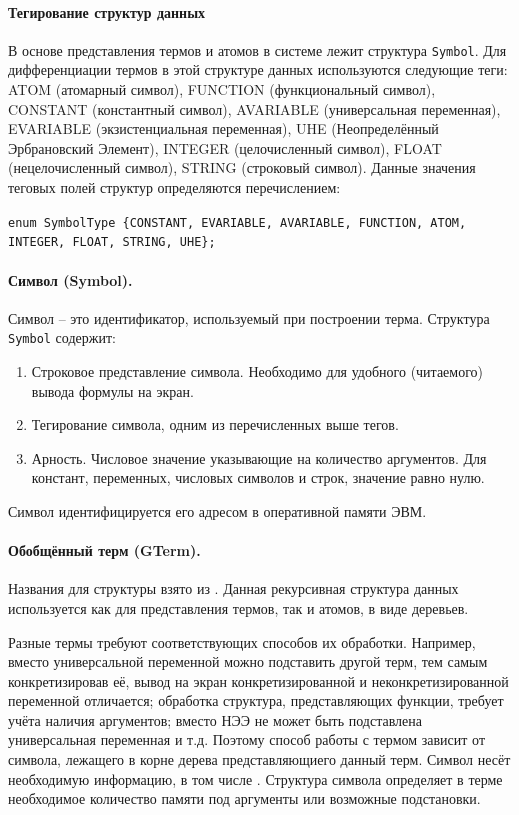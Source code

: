 
\paragraph{Тегирование структур данных}
В основе представления термов и атомов в системе лежит структура \texttt{Symbol}. %
Для дифференциации термов в этой структуре данных используются следующие теги: ATOM (атомарный символ), FUNCTION (функциональный символ), CONSTANT (константный символ), AVARIABLE (универсальная переменная), EVARIABLE (экзистенциальная переменная), UHE (Неопределённый Эрбрановский Элемент), INTEGER (целочисленный символ), FLOAT (нецелочисленный символ), STRING (строковый символ). Данные значения теговых полей структур определяются перечислением:

{\tt enum SymbolType \{CONSTANT, EVARIABLE, AVARIABLE, FUNCTION, ATOM, INTEGER, FLOAT, STRING, UHE\};}

\paragraph{Символ (Symbol).}
Символ -- это идентификатор, используемый при построении терма. Структура \texttt{Symbol} содержит:
\begin{enumerate}
\item Строковое представление символа. Необходимо для удобного (читаемого) вывода формулы на экран.
\item Тегирование символа, одним из перечисленных выше тегов.
\item Арность. Числовое значение указывающие на количество аргументов. Для констант, переменных, числовых символов и строк, значение равно нулю.
\end{enumerate}

Символ идентифицируется его адресом в оперативной памяти ЭВМ.

\paragraph{Обобщённый терм (GTerm).}
Названия для структуры взято из \cite{NNN}. Данная рекурсивная структура данных используется как для представления термов, так и атомов, в виде деревьев.

Разные термы требуют соответствующих способов их обработки. Например, вместо универсальной переменной можно подставить другой терм, тем самым конкретизировав её, вывод на экран конкретизированной и неконкретизированной переменной отличается; обработка  структура, представляющих функции, требует учёта наличия аргументов; вместо НЭЭ не может быть подставлена универсальная переменная и т.д. Поэтому способ работы с термом зависит от символа, лежащего в корне дерева представляющиего данный терм. Символ несёт необходимую информацию, в том числе . Структура символа определяет в терме необходимое количество памяти под аргументы или возможные подстановки.

